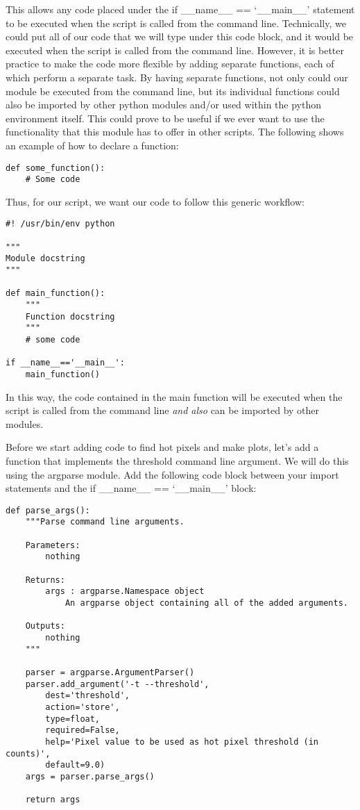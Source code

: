 This allows any code placed under the {\sf\small if \_\_name\_\_ == `\_\_main\_\_'} statement 
to be executed when the script is called from the command line.  Technically, we could 
put all of our code that we will type under this code block, 
and it would be executed when the script is called from the command line.  
However, it is better practice to make the code more flexible by adding separate 
functions, each of which perform a separate task.  By having separate functions, not only 
could our module be executed from the command line, but its individual functions could also be 
imported by other python modules and/or used within the python environment itself. 
This could prove to be useful if we ever want to use the functionality that this module has to 
offer in other scripts.  The following shows an example of how to declare a function:

\begin{verbatim}
def some_function():
    # Some code
\end{verbatim}

Thus, for our script, we want our code to follow this generic workflow:

\begin{verbatim}
#! /usr/bin/env python

"""
Module docstring
"""

def main_function():
    """
    Function docstring
    """
    # some code

if __name__=='__main__':
    main_function()
\end{verbatim}

In this way, the code contained in the main function will be executed when the script is
called from the command line \textit{and also} can be imported by other modules.

Before we start adding code to find hot pixels and make plots, let's add a function
that implements the threshold command line argument.  We will do this using the {\sf\small argparse}
module.  Add the following code block between your import statements and the {\sf\small if \_\_name\_\_ == `\_\_main\_\_'}
block:

\begin{verbatim}
def parse_args():
    """Parse command line arguments.

    Parameters:
        nothing

    Returns:
        args : argparse.Namespace object
            An argparse object containing all of the added arguments.

    Outputs:
        nothing
    """

    parser = argparse.ArgumentParser()
    parser.add_argument('-t --threshold',
        dest='threshold',
        action='store',
        type=float,
        required=False,
        help='Pixel value to be used as hot pixel threshold (in counts)',
        default=9.0)
    args = parser.parse_args()

    return args
\end{verbatim}

